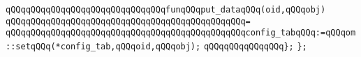 \newline
\verb|qQQqqQQqqQQqqQQqqQQqqQQqqQQqqQQqfunqQQqput_dataqQQq(oid,qQQqobj)|\newline
\verb|qQQqqQQqqQQqqQQqqQQqqQQqqQQqqQQqqQQqqQQqqQQqqQQq=|\newline
\verb|qQQqqQQqqQQqqQQqqQQqqQQqqQQqqQQqqQQqqQQqqQQqqQQqconfig_tabqQQq:=qQQqom::setqQQq(*config_tab,qQQqoid,qQQqobj);|\newline
\verb|qQQqqQQqqQQqqQQq};|\newline
\newline
\verb|};|\newline
\newline
\newline

